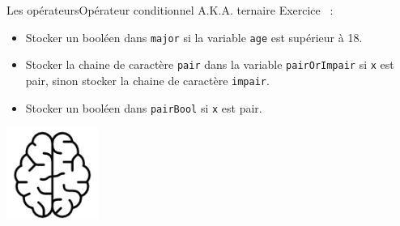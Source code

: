 \documentclass{beamer}
\begin{document}
\begin{frame}{Les opérateurs}{Opérateur conditionnel A.K.A. ternaire}
    Exercice \execcounterdispinc{}~:
    \begin{itemize}
        \item Stocker un booléen dans \lstinline{major} si la variable \lstinline{age} est
              supérieur à 18.
        \item Stocker la chaine de caractère
              \lstinline{pair} dans la variable \lstinline{pairOrImpair} si
              \lstinline{x} est pair, sinon stocker la chaine de caractère \lstinline{impair}.
        \item Stocker un booléen dans \lstinline{pairBool} si \lstinline{x} est pair.
    \end{itemize}
    \bigbreak
    \centering
    \includegraphics[width=3cm]{image/intelligence}
\end{frame}
\end{document}
